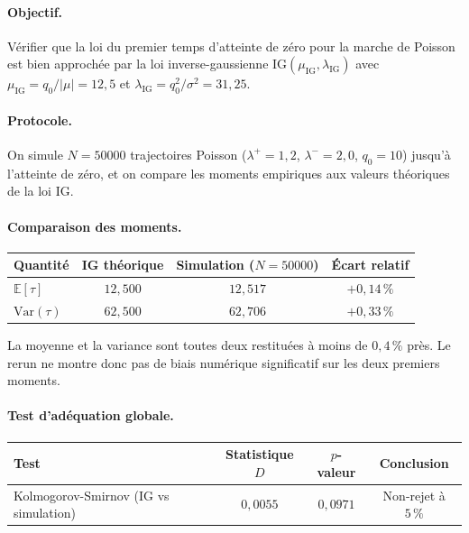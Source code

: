 \documentclass[11pt,a4paper]{article}
\theoremstyle{definition}
\newcommand{\E}{\mathbb{E}}
\newcommand{\IG}{\mathrm{IG}}
\newcommand{\Var}{\mathrm{Var}}
\begin{document}
\begin{demonstration}

\paragraph{Objectif.}
Vérifier que la loi du premier temps d'atteinte de zéro pour la marche de
Poisson est bien approchée par la loi inverse-gaussienne $\IG(\mu_\IG,\lambda_\IG)$
avec $\mu_\IG=q_0/|\mu|=12{,}5$ et $\lambda_\IG=q_0^2/\sigma^2=31{,}25$.

\paragraph{Protocole.}
On simule $N=50000$ trajectoires Poisson ($\lambda^+=1{,}2$, $\lambda^-=2{,}0$,
$q_0=10$) jusqu'à l'atteinte de zéro, et on compare les moments empiriques
aux valeurs théoriques de la loi IG.

\paragraph{Comparaison des moments.}

\begin{center}\small
\begin{tabular}{@{}lccc@{}}
\toprule
Quantité & IG théorique & Simulation ($N=50000$) & Écart relatif \\
\midrule
$\E[\tau]$   & $12{,}500$ & $12{,}517$ & $+0{,}14\,\%$ \\
$\Var(\tau)$ & $62{,}500$ & $62{,}706$ & $+0{,}33\,\%$ \\
\bottomrule
\end{tabular}
\end{center}

La moyenne et la variance sont toutes deux restituées à moins de
$0{,}4\,\%$ près. Le rerun ne montre donc pas de biais numérique significatif
sur les deux premiers moments.

\paragraph{Test d'adéquation globale.}

\begin{center}\small
\begin{tabular}{@{}lccc@{}}
\toprule
Test & Statistique $D$ & $p$-valeur & Conclusion \\
\midrule
Kolmogorov-Smirnov (IG vs simulation) & $0{,}0055$ & $0{,}0971$ & Non-rejet à $5\,\%$ \\
\bottomrule
\end{tabular}
\end{center}


\end{demonstration}
\end{document}

